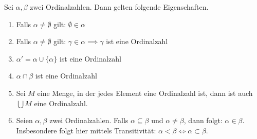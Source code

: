 \documentclass[11pt]{scrartcl}
\begin{document}
\begin{theorem}\label{propOrdinals}
	Sei $\alpha,\beta$ zwei Ordinalzahlen. Dann gelten folgende Eigenschaften.
	\begin{enumerate}
		\item Falls $\alpha\neq\emptyset$ gilt: $\emptyset \in \alpha$
		\item Falls $\alpha \neq \emptyset$ gilt: $\gamma \in \alpha \implies \gamma$ ist eine Ordinalzahl
		\item\label{succIsOrdinal} $\alpha'= \alpha \cup \{\alpha\}$ ist eine Ordinalzahl
		\item $\alpha \cap \beta$ ist eine Ordinalzahl
		\item Sei $M$ eine Menge, in der jedes Element eine Ordinalzahl ist, dann ist auch $\bigcup M$ eine Ordinalzahl.
		\item\label{subsetLess} Seien $\alpha,\beta$ zwei Ordinalzahlen. Falls $\alpha \subseteq \beta$ und $\alpha \neq \beta$, dann folgt: $\alpha \in \beta$. Insbesondere folgt hier mittels Transitivität: $\alpha < \beta \iff \alpha \subset \beta$.
	\end{enumerate}
\end{theorem}
\end{document}
